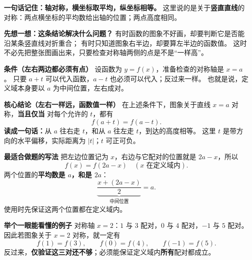 \begin{statementbox}


  \textbf{一句话记住：轴对称，横坐标取平均，纵坐标相等。}
  这里说的是关于\textbf{竖直直线}的对称：两点横坐标的平均数给出轴的位置；两点高度相同。

  \textbf{\textcolor{CStatement}{先想一想：这条结论解决什么问题？}}
  有时函数的图象不好画，却要判断它是否能沿某条竖直线对折重合；
  有时只知道图象右半边，却要算左半边的函数值。
  这时不必先把整张图画出来，只要检查对称轴两侧的点是不是“一样高”。

  \medskip
  \textbf{\textcolor{CStatement}{条件（左右两边都必须有点）}}
  设函数为 $y=f(x)$，准备检查的对称轴是 $x=a$。
  只要 $a+t$ 可以代入函数，$a-t$ 也必须可以代入；反过来一样。
  也就是说，定义域本身要以 $a$ 为中间位置，左右成对。

  \medskip
  \end{statementbox}\clearpage\begin{statementbox}\textbf{\textcolor{CStatement}{核心结论（左右一样远，函数值一样）}}
  在上述条件下，图象关于直线 $x=a$ 对称，\textbf{当且仅当}
  对每个允许的 $t$，都有
  \[
    \boxed{f(a+t)=f(a-t)}.
  \]
  \textbf{读成一句话：}从 $a$ 往右走 $t$，和从 $a$ 往左走 $t$，到达的高度相等。
  这里 $t$ 是带方向的水平偏移，实际距离为 $|t|$；$t$ 可正可负。

  \medskip
  \textbf{\textcolor{CStatement}{最适合做题的写法}}
  把左边位置记为 $x$，右边与它配对的位置就是 $2a-x$，所以
  \[
    \boxed{f(x)=f(2a-x)\quad(x\text{ 在定义域内})}.
  \]
  两个位置的\textbf{平均数是 $a$，和是 $2a$}：
  \[
    \underbrace{\frac{x+(2a-x)}{2}}_{\text{中间位置}}=a.
  \]
  使用时先保证这两个位置都在定义域内。

  \medskip
  \textbf{\textcolor{CStatement}{举个一眼能看懂的例子}}
  对称轴 $x=2$：$1$ 与 $3$ 配对，$0$ 与 $4$ 配对，$-1$ 与 $5$ 配对。
  因此若图象关于 $x=2$ 对称，就一定有
  \[
    f(1)=f(3),\qquad f(0)=f(4),\qquad f(-1)=f(5).
  \]
  反过来，\textbf{仅验证这三对还不够}；必须能保证定义域内\textbf{所有}配对都成立。
\end{statementbox}
\clearpage
